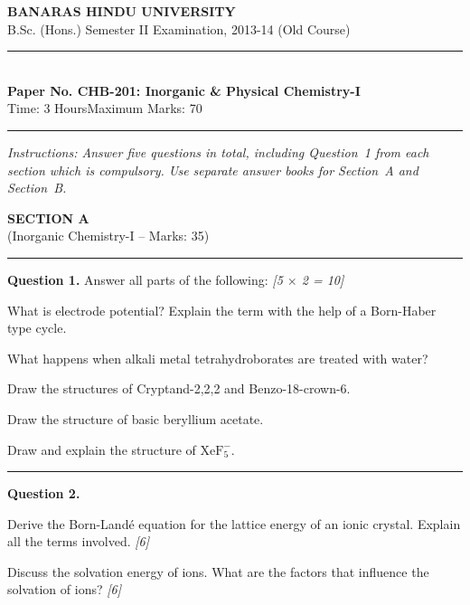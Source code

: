 \documentclass[11pt,a4paper]{article}
\newcommand{\pts}[1]{\hfill   \textit{[#1]}}
\begin{document}
\begin{center}
  {\large\bfseries BANARAS HINDU UNIVERSITY}\\[2pt]
  {\normalsize B.Sc. (Hons.) Semester II Examination, 2013-14 (Old Course)}\\[6pt]
  \rule{0.8\linewidth}{0.5pt}\\[6pt]
  {\large\bfseries Paper No. CHB-201: Inorganic \& Physical Chemistry-I}\\[4pt]
  {\normalsize Time: 3 Hours\hfill Maximum Marks: 70}
\end{center}
\rule{\linewidth}{0.4pt}
\small



\noindent   \textit{Instructions: Answer five questions in total, including Question~1 from each section which is compulsory. Use separate answer books for Section~A and Section~B.}

\normalsize
\bigskip


\begin{center}
  {\large\bfseries SECTION A}\\[2pt]
  {\normalsize (Inorganic Chemistry-I -- Marks: 35)}
\end{center}
\rule{0.4\linewidth}{0.2pt}
\smallskip




\noindent   \textbf{Question 1.} Answer all parts of the following: \pts{5 $ \times$ 2 = 10}

\begin{parts}
  \item What is electrode potential? Explain the term with the help of a Born-Haber type cycle.
  \item What happens when alkali metal tetrahydroborates are treated with water?
  \item Draw the structures of Cryptand-2,2,2 and Benzo-18-crown-6.
  \item Draw the structure of basic beryllium acetate.
  \item Draw and explain the structure of $ \text{XeF}_5^-$.
\end{parts}

\medskip\rule{\linewidth}{0.2pt}




\noindent   \textbf{Question 2.}

\begin{parts}
  \item Derive the Born-Land\'e equation for the lattice energy of an ionic crystal. Explain all the terms involved. \pts{6}
  \item Discuss the solvation energy of ions. What are the factors that influence the solvation of ions? \pts{6}
\end{parts}
\end{document}
